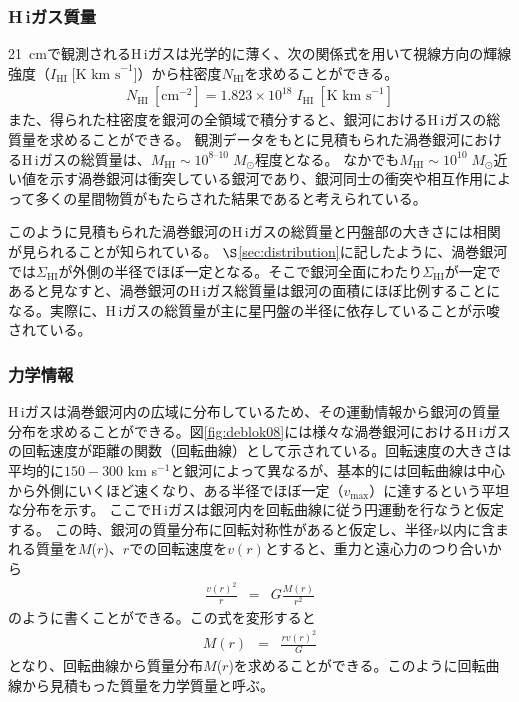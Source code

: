 \subsubsection{H\,{\sc i}ガス質量}
21~cmで観測されるH\,{\sc i}ガスは光学的に薄く、次の関係式を用いて視線方向の輝線強度（$I_\mathrm{HI}\; \mbox{[K km s}^{-1}$]）から柱密度$N_\mathrm{HI}$を求めることができる。
	\begin{eqnarray}
		N_\mathrm{HI}~[\text{cm}^{-2}] = 1.823 \times 10^{18} \; I_\mathrm{HI}~[\text{K km s}^{-1}] 
	\end{eqnarray}
また、得られた柱密度を銀河の全領域で積分すると、銀河におけるH\,{\sc i}ガスの総質量を求めることができる。
観測データをもとに見積もられた渦巻銀河におけるH\,{\sc i}ガスの総質量は、$M_{\text{HI}}\sim10^{8\mbox{--}10} \; M_\odot$程度となる\citep[e.g.,][]{2008AJ....136.2563W}。
なかでも$M_{\text{HI}} \sim10^{10} \; M_\odot$近い値を示す渦巻銀河は衝突している銀河であり、銀河同士の衝突や相互作用によって多くの星間物質がもたらされた結果であると考えられている。

このように見積もられた渦巻銀河のH\,{\sc i}ガスの総質量と円盤部の大きさには相関が見られることが知られている。
$\S$\ref{sec:distribution}に記したように、渦巻銀河では$\Sigma_{\text{HI}}$が外側の半径でほぼ一定となる。そこで銀河全面にわたり$\Sigma_{\text{HI}}$が一定であると見なすと、渦巻銀河のH\,{\sc i}ガス総質量は銀河の面積にほぼ比例することになる。実際に、H\,{\sc i}ガスの総質量が主に星円盤の半径に依存していることが示唆されている\citep[e.g.,][]{2012ApJ...756..183B}。


\subsubsection{力学情報}
H\,{\sc i}ガスは渦巻銀河内の広域に分布しているため、その運動情報から銀河の質量分布を求めることができる。図\ref{fig:deblok08}には様々な渦巻銀河におけるH\,{\sc i}ガスの回転速度が距離の関数（回転曲線）として示されている。回転速度の大きさは平均的に$150-300$ km s$^{-1}$と銀河によって異なるが、基本的には回転曲線は中心から外側にいくほど速くなり、ある半径でほぼ一定（$v_{\text{max}}$）に達するという平坦な分布を示す\citep[e.g.,][]{1980ApJ...238..471R, 1985ApJ...289...81R,1981AJ.....86.1791B, 1987IAUS..117...67S, 1987IAUS..124..699S}。
ここでH\,{\sc i}ガスは銀河内を回転曲線に従う円運動を行なうと仮定する。
この時、銀河の質量分布に回転対称性があると仮定し、半径$r$以内に含まれる質量を$M$($r$)、$r$での回転速度を$v(r)$とすると、重力と遠心力のつり合いから
	\begin{eqnarray}
		\frac{v( r)^2}{r}	& = &	G \frac{M( r)}{r^2}
	\end{eqnarray}
のように書くことができる。この式を変形すると
	\begin{eqnarray} \label{eq:galrot}
		M( r)	& = &	\frac{rv( r)^2}{G}
	\end{eqnarray}
となり、回転曲線から質量分布$M$($r$)を求めることができる。このように回転曲線から見積もった質量を力学質量と呼ぶ。

